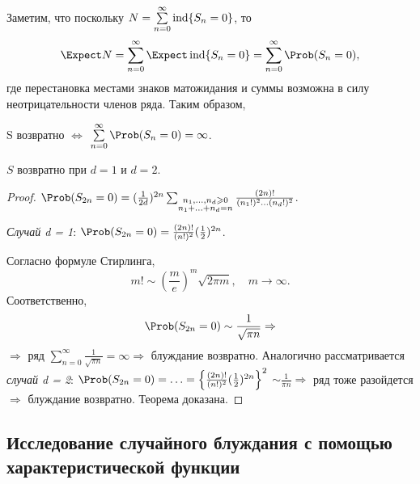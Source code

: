 \begin{note}
  Заметим, что поскольку $N = \sum\limits_{n=0}^{\infty} \operatorname{ind} \lbrace S_{n} = 0 \rbrace$, то
  \begin{equation*}
    \Expect N = \sum_{n=0}^{\infty} \Expect \ind \lbrace S_{n} = 0 \rbrace = \sum\limits_{n=0}^{\infty} \Prob(S_{n} = 0),
  \end{equation*}
  где перестановка местами знаков матожидания и суммы возможна в силу неотрицательности членов ряда. Таким образом, \begin{center}
    S возвратно $\Leftrightarrow$ $\sum\limits_{n=0}^{\infty} \Prob(S_{n} = 0) = \infty$.
  \end{center}
\end{note}

\begin{cor}
  $S$ возвратно при $d = 1$ и $d = 2$.
\end{cor}

\begin{proof}
  $\Prob(S_{2n} = 0) = (\frac{1}{2d})^{2n} \sum_{\substack{n_{1}, \ldots, n_{d} \geqslant 0 \\ n_{1} + \ldots + n_{d} = n}} \frac{(2n)!}{(n_{1}!)^{2} \ldots (n_{d}!)^{2}}$.
  \begin{flushleft}
    \emph{Случай d = 1}: $\Prob(S_{2n} = 0) = \frac{(2n)!}{(n!)^{2}}(\frac{1}{2})^{2n}$.
  \end{flushleft}Согласно формуле Стирлинга,
  \begin{equation*}
    m! \sim \left(\frac{m}{e}\right)^{m} \sqrt{2 \pi m}, \quad m \rightarrow \infty.
  \end{equation*}
  Соответственно,
  \begin{equation*}
    \Prob(S_{2n} = 0) \sim \frac{1}{\sqrt{\pi n}} \Rightarrow
  \end{equation*}
  $\Rightarrow$ ряд $\sum\limits_{n=0}^{\infty} \frac{1}{\sqrt{\pi n}} = \infty \Rightarrow$ блуждание возвратно.
  Аналогично рассматривается \emph{случай d = 2}: $\Prob(S_{2n} = 0) = \ldots = \left\lbrace \frac{(2n)!}{(n!)^{2}}(\frac{1}{2})^{2n} \right\rbrace ^{2}$ $\sim \frac{1}{\pi n} \Rightarrow$ ряд тоже разойдется $\Rightarrow$ блуждание возвратно. Теорема доказана.
\end{proof}

\subsection{Исследование случайного блуждания с помощью характеристической функции}

